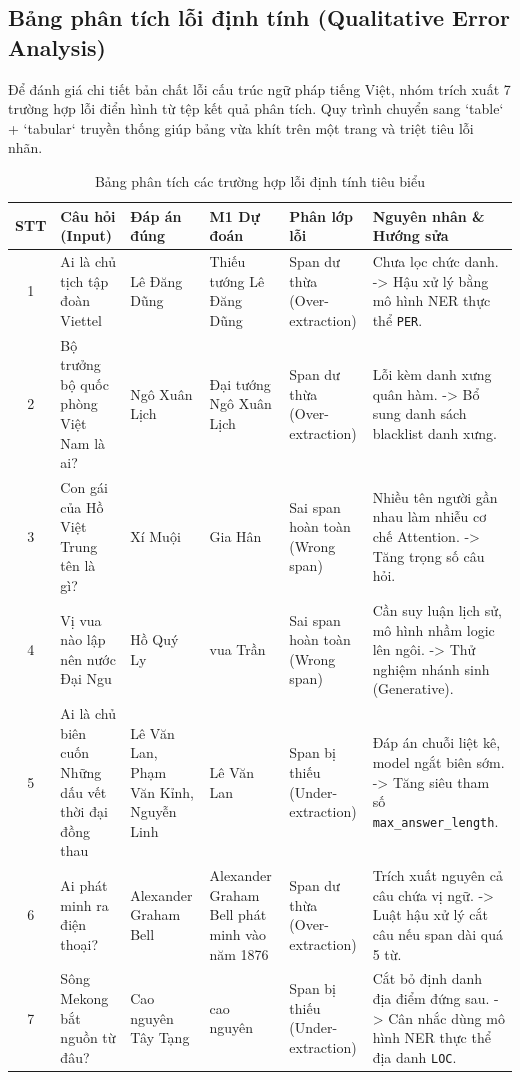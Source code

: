 \documentclass[12pt, a4paper]{article}
\begin{document}
\subsection{Bảng phân tích lỗi định tính (Qualitative Error Analysis)}
Để đánh giá chi tiết bản chất lỗi cấu trúc ngữ pháp tiếng Việt, nhóm trích xuất 7 trường hợp lỗi điển hình từ tệp kết quả phân tích. Quy trình chuyển sang `table` + `tabular` truyền thống giúp bảng vừa khít trên một trang và triệt tiêu lỗi nhãn.

\begin{table}[H]
  \centering
  \small
  \caption{Bảng phân tích các trường hợp lỗi định tính tiêu biểu}
  \begin{tabular}{|c|p{3cm}|p{1.8cm}|p{2.2cm}|p{2.2cm}|p{3.8cm}|}
    \hline
    \textbf{STT} & \textbf{Câu hỏi (Input)} & \textbf{Đáp án đúng} & \textbf{M1 Dự đoán} & \textbf{Phân lớp lỗi} & \textbf{Nguyên nhân \& Hướng sửa} \\ \hline
    1 & Ai là chủ tịch tập đoàn Viettel & Lê Đăng Dũng & Thiếu tướng Lê Đăng Dũng & Span dư thừa (Over-extraction) & Chưa lọc chức danh. -> Hậu xử lý bằng mô hình NER thực thể \texttt{PER}. \\ \hline
    2 & Bộ trưởng bộ quốc phòng Việt Nam là ai? & Ngô Xuân Lịch & Đại tướng Ngô Xuân Lịch & Span dư thừa (Over-extraction) & Lỗi kèm danh xưng quân hàm. -> Bổ sung danh sách blacklist danh xưng. \\ \hline
    3 & Con gái của Hồ Việt Trung tên là gì? & Xí Muội & Gia Hân & Sai span hoàn toàn (Wrong span) & Nhiều tên người gần nhau làm nhiễu cơ chế Attention. -> Tăng trọng số câu hỏi. \\ \hline
    4 & Vị vua nào lập nên nước Đại Ngu & Hồ Quý Ly & vua Trần & Sai span hoàn toàn (Wrong span) & Cần suy luận lịch sử, mô hình nhầm logic lên ngôi. -> Thử nghiệm nhánh sinh (Generative). \\ \hline
    5 & Ai là chủ biên cuốn Những dấu vết thời đại đồng thau & Lê Văn Lan, Phạm Văn Kỉnh, Nguyễn Linh & Lê Văn Lan & Span bị thiếu (Under-extraction) & Đáp án chuỗi liệt kê, model ngắt biên sớm. -> Tăng siêu tham số \texttt{max\_answer\_length}. \\ \hline
    6 & Ai phát minh ra điện thoại? & Alexander Graham Bell & Alexander Graham Bell phát minh vào năm 1876 & Span dư thừa (Over-extraction) & Trích xuất nguyên cả câu chứa vị ngữ. -> Luật hậu xử lý cắt câu nếu span dài quá 5 từ. \\ \hline
    7 & Sông Mekong bắt nguồn từ đâu? & Cao nguyên Tây Tạng & cao nguyên & Span bị thiếu (Under-extraction) & Cắt bỏ định danh địa điểm đứng sau. -> Cân nhắc dùng mô hình NER thực thể địa danh \texttt{LOC}. \\ \hline
  \end{tabular}
  \label{tab:loidinhtinh}
\end{table}
\end{document}
